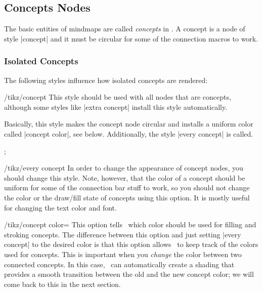 \subsection{Concepts Nodes}

The basic entities of mindmaps are called \emph{concepts} in
\tikzname. A concept is a node of style |concept| and it must be
circular for some of the connection macros to work.


\subsubsection{Isolated Concepts}

The following styles influence how isolated concepts are rendered:

\begin{stylekey}{/tikz/concept}
  This style should be used with all nodes that are concepts, although
  some styles like |extra concept| install this style automatically.

  Basically, this style makes the concept node circular and installs a
  uniform color called |concept color|, see below. Additionally, the
  style |every concept| is called.
\begin{codeexample}[]
\tikz[mindmap,concept color=red!50] ;
\end{codeexample}

  \begin{stylekey}{/tikz/every concept}
    In order to change the appearance of concept nodes, you should
    change this style. Note, however, that the color of a concept should
    be uniform for some of the connection bar stuff to work, so you
    should not change the color or the draw/fill state of concepts using
    this option. It is mostly useful for changing the text color and
    font.
  \end{stylekey}

  \begin{key}{/tikz/concept color=}
    This option tells \tikzname\ which color should be used for filling
    and stroking concepts. The difference between this option and just
    setting |every concept| to the desired color is that this option
    allows \tikzname\ to keep track of the colors used for
    concepts. This is important when you \emph{change} the color between
    two connected concepts. In this case, \tikzname\ can automatically
    create a shading that provides a smooth transition between the old
    and the new concept color; we will come back to this in the next
    section.
  \end{key}
\end{stylekey}

